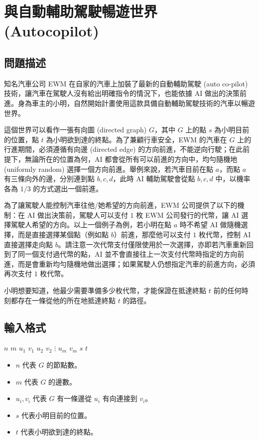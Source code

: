 \section{與自動輔助駕駛暢遊世界 (Autocopilot)}

\subsection{問題描述}

知名汽車公司 EWM 在自家的汽車上加裝了最新的自動輔助駕駛 (auto co-pilot)
技術，讓汽車在駕駛人沒有給出明確指令的情況下，也能依據 AI
做出的決策前進。身為車主的小明，自然開始計畫使用這款具備自動輔助駕駛技術的汽車以暢遊世界。

這個世界可以看作一張有向圖 (directed graph) \(G\)，其中 \(G\) 上的點
\(s\) 為小明目前的位置，點 \(t\)
為小明欲到達的終點。為了兼顧行車安全，EWM 的汽車在 \(G\)
上的行進期間，必須遵循有向邊 (directed edge)
的方向前進，不能逆向行駛；在此前提下，無論所在的位置為何，AI
都會從所有可以前進的方向中，均勻隨機地 (uniformly random)
選擇一個方向前進。舉例來說，若汽車目前在點 \(a\)，而點 \(a\)
有三條向外的邊，分別連到點 \(b, c, d\)，此時 AI 輔助駕駛會從點
\(b, c, d\) 中，以機率各為 \(1/3\) 的方式選出一個前進。

為了讓駕駛人能控制汽車往他/她希望的方向前進，EWM
公司提供了以下的機制：在 AI 做出決策前，駕駛人可以支付 \(1\) 枚 EWM
公司發行的代幣，讓 AI 選擇駕駛人希望的方向。以上一個例子為例，若小明在點
\(a\) 時不希望 AI 做隨機選擇，而是直接選擇某個點（例如點
\(b\)）前進，那麼他可以支付 \(1\) 枚代幣，控制 AI 直接選擇走向點
\(b\)。請注意一次代幣支付僅限使用於一次選擇，亦即若汽車重新回到了同一個支付過代幣的點，AI
並不會直接往上一次支付代幣時指定的方向前進，而是會重新均勻隨機地做出選擇；如果駕駛人仍想指定汽車的前進方向，必須再次支付
\(1\) 枚代幣。

小明想要知道，他最少需要準備多少枚代幣，才能保證在抵達終點 \(t\)
前的任何時刻都存在一條從他的所在地抵達終點 \(t\) 的路徑。

\subsection{輸入格式}

\begin{format}
\f{
$n$ $m$
$u_1$ $v_1$
$u_2$ $v_2$
$\vdots$
$u_m$ $v_m$
$s$ $t$
}
\end{format}

\begin{itemize}
\tightlist
\item
  \(n\) 代表 \(G\) 的節點數。
\item
  \(m\) 代表 \(G\) 的邊數。
\item
  \(u_i, v_i\) 代表 \(G\) 有一條邊從 \(u_i\) 有向連接到 \(v_i\)。
\item
  \(s\) 代表小明目前的位置。
\item
  \(t\) 代表小明欲到達的終點。
\end{itemize}

